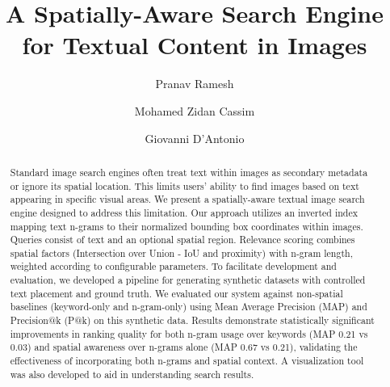 \documentclass[manuscript,screen]{acmart}
\begin{document}
\title{A Spatially-Aware Search Engine for Textual Content in Images}

\author{Pranav Ramesh}

\author{Mohamed Zidan Cassim}

\author{Giovanni D'Antonio}

\renewcommand{\shortauthors}{Ramesh et al.}

\begin{abstract}
  Standard image search engines often treat text within images as secondary metadata or ignore its spatial location. This limits users' ability to find images based on text appearing in specific visual areas. We present a spatially-aware textual image search engine designed to address this limitation. Our approach utilizes an inverted index mapping text n-grams to their normalized bounding box coordinates within images. Queries consist of text and an optional spatial region. Relevance scoring combines spatial factors (Intersection over Union - IoU and proximity) with n-gram length, weighted according to configurable parameters. To facilitate development and evaluation, we developed a pipeline for generating synthetic datasets with controlled text placement and ground truth. We evaluated our system against non-spatial baselines (keyword-only and n-gram-only) using Mean Average Precision (MAP) and Precision@k (P@k) on this synthetic data. Results demonstrate statistically significant improvements in ranking quality for both n-gram usage over keywords (MAP 0.21 vs 0.03) and spatial awareness over n-grams alone (MAP 0.67 vs 0.21), validating the effectiveness of incorporating both n-grams and spatial context. A visualization tool was also developed to aid in understanding search results.
\end{abstract}
\end{document}
